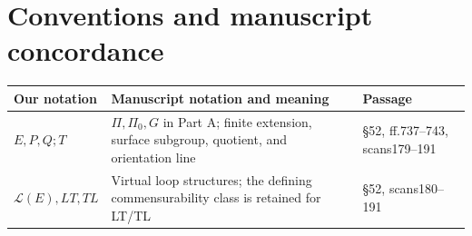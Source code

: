 \section*{Conventions and manuscript concordance}
\begingroup\fontsize{9.3}{10.8}\selectfont
\setlength{\tabcolsep}{4pt}
\begin{longtable}{p{}p{}p{}}
\toprule Our notation & Manuscript notation and meaning & Passage\\\midrule
$E,P,Q;T$ & $\Pi,\Pi_0,G$ in Part A; finite extension, surface subgroup, quotient, and orientation line & \S52, ff.737--743, scans179--191\\
$\mathcal L(E),LT,TL$ & Virtual loop structures; the defining commensurability class is retained for LT/TL & \S52, scans180--191\\


\end{longtable}
